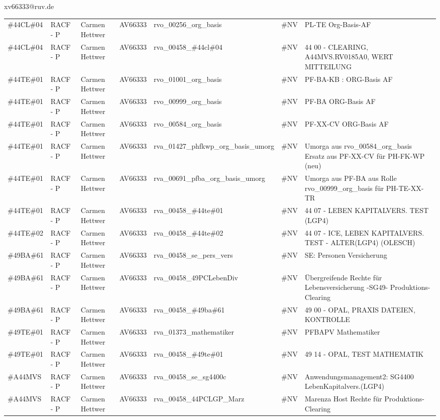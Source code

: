 \documentclass[a4paper,landscape,12pt]{letter}
\begin{document}
\begin{letter}{xv66333@ruv.de\hfill \break}
\begin{tiny}
\begin{longtable}{|p{35mm}|p{15mm}|p{25mm}|p{10mm}|p{40mm}|p{50mm}|p{50mm}|}
\#44CL\#04 & RACF - P & Carmen Hettwer & AV66333 & rvo\_00256\_org\_basis & \#NV & PL-TE Org-Basis-AF \\
\#44CL\#04 & RACF - P & Carmen Hettwer & AV66333 & rva\_00458\_\#44cl\#04 & \#NV & 44 00 - CLEARING, A44MVS.RV0185A0, WERT MITTEILUNG \\
\#44TE\#01 & RACF - P & Carmen Hettwer & AV66333 & rvo\_01001\_org\_basis & \#NV & PF-BA-KB   : ORG-Basis AF \\
\#44TE\#01 & RACF - P & Carmen Hettwer & AV66333 & rvo\_00999\_org\_basis & \#NV & PF-BA    ORG-Basis AF \\
\#44TE\#01 & RACF - P & Carmen Hettwer & AV66333 & rvo\_00584\_org\_basis & \#NV & PF-XX-CV    ORG-Basis AF \\
\#44TE\#01 & RACF - P & Carmen Hettwer & AV66333 & rva\_01427\_phfkwp\_org\_basis\_umorg & \#NV & Umorga aus rvo\_00584\_org\_basis Ersatz aus PF-XX-CV für PH-FK-WP (neu) \\
\#44TE\#01 & RACF - P & Carmen Hettwer & AV66333 & rva\_00691\_pfba\_org\_basis\_umorg & \#NV & Umorga aus PF-BA aus Rolle rvo\_00999\_org\_basis für PH-TE-XX-TR \\
\#44TE\#01 & RACF - P & Carmen Hettwer & AV66333 & rva\_00458\_\#44te\#01 & \#NV & 44 07 - LEBEN KAPITALVERS. TEST (LGP4) \\
\#44TE\#02 & RACF - P & Carmen Hettwer & AV66333 & rva\_00458\_\#44te\#02 & \#NV & 44 07 - ICE, LEBEN KAPITALVERS. TEST - ALTER(LGP4) (OLESCH) \\
\#49BA\#61 & RACF - P & Carmen Hettwer & AV66333 & rva\_00458\_se\_pers\_vers & \#NV & SE: Personen Versicherung \\
\#49BA\#61 & RACF - P & Carmen Hettwer & AV66333 & rva\_00458\_49PCLebenDiv & \#NV & Übergreifende Rechte für Lebensversicherung -SG49- Produktions- Clearing \\
\#49BA\#61 & RACF - P & Carmen Hettwer & AV66333 & rva\_00458\_\#49ba\#61 & \#NV & 49 00 - OPAL, PRAXIS DATEIEN, KONTROLLE \\
\#49TE\#01 & RACF - P & Carmen Hettwer & AV66333 & rva\_01373\_mathematiker & \#NV & PFBAPV Mathematiker \\
\#49TE\#01 & RACF - P & Carmen Hettwer & AV66333 & rva\_00458\_\#49te\#01 & \#NV & 49 14 - OPAL, TEST MATHEMATIK \\
\#A44MVS & RACF - P & Carmen Hettwer & AV66333 & rva\_00458\_se\_sg4400c & \#NV & Anwendungsmanagement2: SG4400 LebenKapitalvers.(LGP4) \\
\#A44MVS & RACF - P & Carmen Hettwer & AV66333 & rva\_00458\_44PCLGP\_Marz & \#NV & Marenza Host Rechte für Produktions-Clearing \\

\end{longtable}
\end{tiny}
\end{letter}
\end{document}
